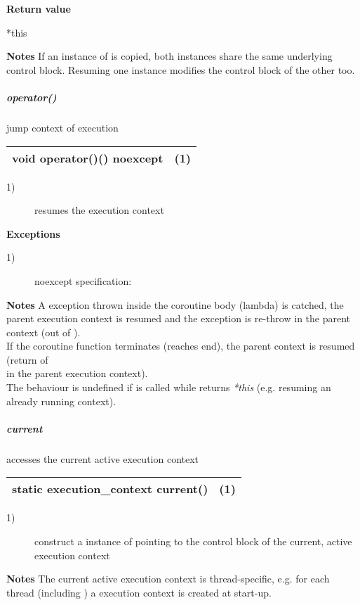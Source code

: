 {\bfseries Return value}
\begin{description}
    \item[*this]
\end{description}

{\bfseries Notes}
\newline
If an instance of \ectx is copied, both instances share the same underlying
control block. Resuming one instance modifies the control block of the other
\ectx too.

\subparagraph*{operator()}
jump context of execution\\

\begin{tabular}{ l l }
    \midrule

    void operator()() noexcept & (1)\\

    \midrule
\end{tabular}

\begin{description}
    \item[1)] resumes the execution context\\
\end{description}

{\bfseries Exceptions}
\begin{description}
    \item[1)] noexcept specification: \\
\end{description}

{\bfseries Notes}
\newline
A exception thrown inside the coroutine body (lambda) is catched, the parent
execution context is resumed and the exception is re-throw in the parent
context (out of \ectxop).\\
If the coroutine function terminates (reaches end), the parent context is
resumed (return of\\
\ectxop in the parent execution context).\\
The behaviour is undefined if  is called while 
returns \emph{*this} (e.g. resuming an already running context).

\subparagraph*{current}
accesses the current active execution context\\

\begin{tabular}{ l l }
    \midrule

    static execution\_context current() & (1)\\

    \midrule
\end{tabular}

\begin{description}
    \item[1)] construct a instance of \ectx pointing to the control block of the
              current, active execution context\\
\end{description}

{\bfseries Notes}
\newline
The current active execution context is thread-specific, e.g. for each thread
(including \main) a execution context is created at start-up.
